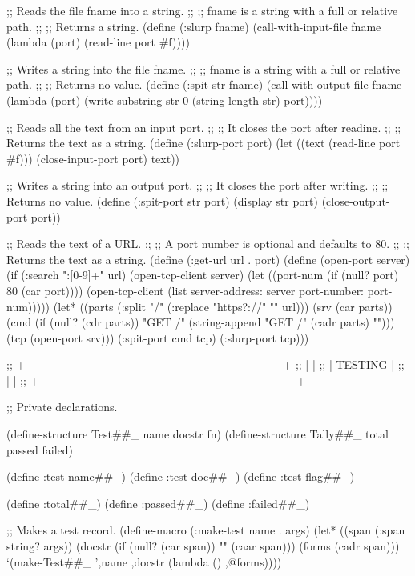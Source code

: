 ;; Reads the file fname into a string.
;;
;; fname is a string with a full or relative path.
;;
;; Returns a string.
(define (:slurp fname)
  (call-with-input-file fname
    (lambda (port) 
      (read-line port #f))))


;; Writes a string into the file fname.
;;
;; fname is a string with a full or relative path.
;;
;; Returns no value.
(define (:spit str fname)
  (call-with-output-file fname
    (lambda (port) 
      (write-substring str 0 (string-length str) port))))


;; Reads all the text from an input port.
;;
;; It closes the port after reading.
;;
;; Returns the text as a string.
(define (:slurp-port port)
  (let ((text (read-line port #f)))
    (close-input-port port)
    text))


;; Writes a string into an output port.
;;
;; It closes the port after writing.
;;
;; Returns no value.
(define (:spit-port str port)
  (display str port)
  (close-output-port port))


;; Reads the text of a URL.
;;
;; A port number is optional and defaults to 80.
;;
;; Returns the text as a string.
(define (:get-url url . port)
  (define (open-port server)
    (if (:search ":[0-9]+" url)
      (open-tcp-client server)
      (let ((port-num (if (null? port) 80 (car port))))
        (open-tcp-client (list server-address: server port-number: port-num)))))
  (let* ((parts (:split "/" (:replace "https?://" "" url)))
         (srv (car parts))
         (cmd (if (null? (cdr parts))
                "GET /\n"
                (string-append "GET /" (cadr parts) "\n")))
         (tcp (open-port srv)))
    (:spit-port cmd tcp)
    (:slurp-port tcp)))


;; +---------------------------------------------------------------------+
;; |                                                                     |
;; |                            TESTING                                  |
;; |                                                                     |
;; +---------------------------------------------------------------------+

;; Private declarations.

(define-structure Test##_ name docstr fn)
(define-structure Tally##_ total passed failed)

(define :test-name##_)
(define :test-doc##_)
(define :test-flag##_)

(define :total##_)
(define :passed##_)
(define :failed##_)


;; Makes a test record.
(define-macro (:make-test name . args)
  (let* ((span (:span string? args))
         (docstr (if (null? (car span)) "" (caar span)))
         (forms (cadr span)))
    `(make-Test##_ ',name ,docstr (lambda () ,@forms))))


